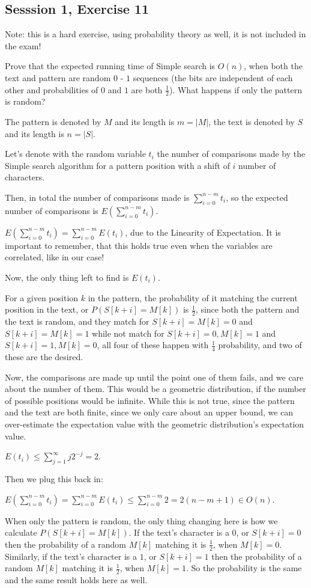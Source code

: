 \subsection{Sesssion 1, Exercise 11}

Note: this is a hard exercise, using probability theory as well, it is not included in the exam!


Prove that the expected running time of Simple search is $O(n)$, when both the text and pattern are random $0$ - $1$ sequences (the bits are independent of each other and probabilities of $0$ and $1$ are both $\frac{1}{2}$). What happens if only the pattern is random?


The pattern is denoted by $M$ and its length is $m=|M|$, the text is denoted by $S$ and its length is $n=|S|$.

Let's denote with the random variable $t_i$ the number of comparisons made by the Simple search algorithm for a pattern position with a shift of $i$ number of characters.

Then, in total the number of comparisons made is $\sum\limits_{i=0}^{n-m}t_i$, so the expected number of comparisons is $E(\sum\limits_{i=0}^{n-m}t_i)$.

$E(\sum\limits_{i=0}^{n-m}t_i) = \sum\limits_{i=0}^{n-m}E(t_i)$, due to the Linearity of Expectation. It is important to remember, that this holds true even when the variables are correlated, like in our case!

Now, the only thing left to find is $E(t_i)$.

For a given position $k$ in the pattern, the probability of it matching the current position in the text, or $P(S[k+i] = M[k])$ is $\frac{1}{2}$, since both the pattern and the text is random, and they match for $S[k+i] = M[k] = 0$ and $S[k+i] = M[k] = 1$ while not match for $S[k+i] = 0, M[k] = 1$ and $S[k+i] = 1, M[k] = 0$, all four of these happen with $\frac{1}{4}$ probability, and two of these are the desired.

Now, the comparisons are made up until the point one of them fails, and we care about the number of them. This would be a geometric distribution, if the number of possible positions would be infinite. While this is not true, since the pattern and the text are both finite, since we only care about an upper bound, we can over-estimate the expectation value with the geometric distribution's expectation value.

$E(t_i) \leq{} \sum\limits_{j=1}^{\infty}j2^{-j} = 2$.

Then we plug this back in:

$E(\sum\limits_{i=0}^{n-m}t_i) = \sum\limits_{i=0}^{n-m}E(t_i) \leq{} \sum\limits_{i=0}^{n-m}2 = 2(n-m+1) \in{} O(n)$.

When only the pattern is random, the only thing changing here is how we calculate $P(S[k+i] = M[k])$. If the text's character is a $0$, or $S[k+i]=0$ then the probability of a random $M[k]$ matching it is $\frac{1}{2}$, when $M[k]=0$. Similarly, if the text's character is a $1$, or $S[k+i]=1$ then the probability of a random $M[k]$ matching it is $\frac{1}{2}$, when $M[k]=1$. So the probability is the same and the same result holds here as well.